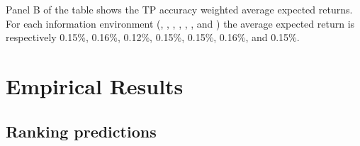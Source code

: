 \documentclass[12pt,a4paper]{article}\usepackage[]{graphicx}\usepackage[]{color}
\begin{document}
Panel B of the table shows the TP accuracy weighted average expected returns. For each information environment (\tr{}, \naive{}, , \last{}, \diff{}, \random{}, and \rollsd{} ) the average expected return  is respectively 0.15\%, 0.16\%,  0.12\%, 0.15\%, 0.15\%, 0.16\%, and 0.15\%.



\section{Empirical Results}
\label{ch4-sec:results}

\subsection{Ranking predictions}
\end{document}
